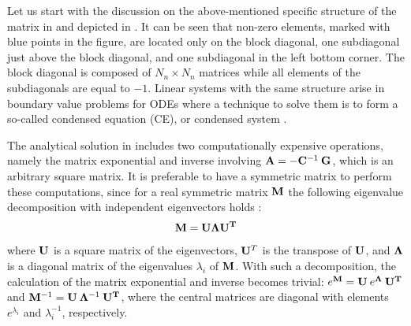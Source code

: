 Let us start with the discussion on the above-mentioned specific structure of the matrix in  and depicted in . It can be seen that non-zero elements, marked with blue points in the figure, are located only on the block diagonal, one subdiagonal just above the block diagonal, and one subdiagonal in the left bottom corner. The block diagonal is composed of $N_n \times N_n$ matrices while all elements of the subdiagonals are equal to $-1$. Linear systems with the same structure arise in boundary value problems for ODEs where a technique to solve them is to form a so-called condensed equation (CE), or condensed system \cite{stoer2002}.

 \label{sec:ce-auxiliary}
The analytical solution in  includes two computationally expensive operations, namely the matrix exponential and inverse involving \mbox{$\mathbf{A} = - \mathbf{C}^{-1} \: \mathbf{G}$}, which is an arbitrary square matrix. It is preferable to have a symmetric matrix to perform these computations, since for a real symmetric matrix $\mathbf{M}$ the following eigenvalue decomposition with independent eigenvectors holds \cite{press2007}:
\begin{equation} \label{eq:eigenvalue-decomposition}
  \mathbf{M} = \mathbf{U} \mathbf{\Lambda} \mathbf{U}^{\mathbf{T}}
\end{equation}
where $\mathbf{U}$ is a square matrix of the eigenvectors, $\mathbf{U}^T$ is the transpose of $\mathbf{U}$, and $\mathbf{\Lambda}$ is a diagonal matrix of the eigenvalues $\lambda_i$ of $\mathbf{M}$. With such a decomposition, the calculation of the matrix exponential and inverse becomes trivial: $e^{\mathbf{M}} = \mathbf{U} \: e^{\mathbf{\Lambda}} \: \mathbf{U}^{\mathbf{T}}$ and $\mathbf{M}^{-1} = \mathbf{U} \: \mathbf{\Lambda}^{-1} \: \mathbf{U}^{\mathbf{T}}$, where the central matrices are diagonal with elements $e^{\lambda_i}$ and $\lambda_i^{-1}$, respectively.

